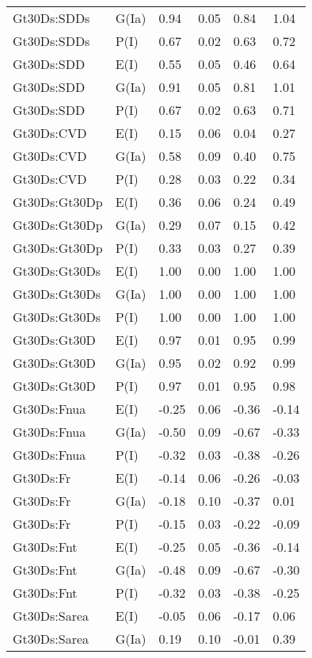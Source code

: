 \begin{center}
\begin{longtable}{|p{1.1in}|p{0.7in}|p{0.7in}|p{0.6in}|p{0.6in}|p{0.6in}|}
  Gt30Ds:SDDs & G(Ia) & 0.94 & 0.05 & 0.84 & 1.04 \\ 
  Gt30Ds:SDDs & P(I) & 0.67 & 0.02 & 0.63 & 0.72 \\ 
  Gt30Ds:SDD & E(I) & 0.55 & 0.05 & 0.46 & 0.64 \\ 
  Gt30Ds:SDD & G(Ia) & 0.91 & 0.05 & 0.81 & 1.01 \\ 
  Gt30Ds:SDD & P(I) & 0.67 & 0.02 & 0.63 & 0.71 \\ 
  Gt30Ds:CVD & E(I) & 0.15 & 0.06 & 0.04 & 0.27 \\ 
  Gt30Ds:CVD & G(Ia) & 0.58 & 0.09 & 0.40 & 0.75 \\ 
  Gt30Ds:CVD & P(I) & 0.28 & 0.03 & 0.22 & 0.34 \\ 
  Gt30Ds:Gt30Dp & E(I) & 0.36 & 0.06 & 0.24 & 0.49 \\ 
  Gt30Ds:Gt30Dp & G(Ia) & 0.29 & 0.07 & 0.15 & 0.42 \\ 
  Gt30Ds:Gt30Dp & P(I) & 0.33 & 0.03 & 0.27 & 0.39 \\ 
  Gt30Ds:Gt30Ds & E(I) & 1.00 & 0.00 & 1.00 & 1.00 \\ 
  Gt30Ds:Gt30Ds & G(Ia) & 1.00 & 0.00 & 1.00 & 1.00 \\ 
  Gt30Ds:Gt30Ds & P(I) & 1.00 & 0.00 & 1.00 & 1.00 \\ 
  Gt30Ds:Gt30D & E(I) & 0.97 & 0.01 & 0.95 & 0.99 \\ 
  Gt30Ds:Gt30D & G(Ia) & 0.95 & 0.02 & 0.92 & 0.99 \\ 
  Gt30Ds:Gt30D & P(I) & 0.97 & 0.01 & 0.95 & 0.98 \\ 
  Gt30Ds:Fnua & E(I) & -0.25 & 0.06 & -0.36 & -0.14 \\ 
  Gt30Ds:Fnua & G(Ia) & -0.50 & 0.09 & -0.67 & -0.33 \\ 
  Gt30Ds:Fnua & P(I) & -0.32 & 0.03 & -0.38 & -0.26 \\ 
  Gt30Ds:Fr & E(I) & -0.14 & 0.06 & -0.26 & -0.03 \\ 
  Gt30Ds:Fr & G(Ia) & -0.18 & 0.10 & -0.37 & 0.01 \\ 
  Gt30Ds:Fr & P(I) & -0.15 & 0.03 & -0.22 & -0.09 \\ 
  Gt30Ds:Fnt & E(I) & -0.25 & 0.05 & -0.36 & -0.14 \\ 
  Gt30Ds:Fnt & G(Ia) & -0.48 & 0.09 & -0.67 & -0.30 \\ 
  Gt30Ds:Fnt & P(I) & -0.32 & 0.03 & -0.38 & -0.25 \\ 
  Gt30Ds:Sarea & E(I) & -0.05 & 0.06 & -0.17 & 0.06 \\ 
  Gt30Ds:Sarea & G(Ia) & 0.19 & 0.10 & -0.01 & 0.39 \\ 

\end{longtable}
\end{center}

